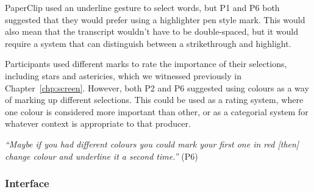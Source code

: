 


PaperClip used an underline gesture to select words, but P1 and P6 both suggested that they would prefer using a
highlighter pen style mark.  This would also mean that the transcript wouldn't have to be double-spaced, but it would
require a system that can distinguish between a strikethrough and highlight.


Participants used different marks to rate the importance of their selections, including stars and astericies, which we
witnessed previously in Chapter~\ref{chp:screen}. However, both P2 and P6 suggested using colours as a way of marking
up different selections.  This could be used as a rating system, where one colour is considered more important than
other, or as a categorial system for whatever context is appropriate to that producer.

\textit{``Maybe if you had different colours you could mark your first one in red [then]
change colour and underline it a second time.''} (P6)





\subsubsection{Interface}

